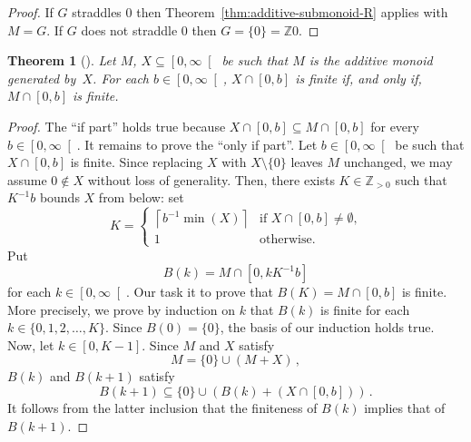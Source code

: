 \documentclass[12pt]{article}
\newcommand{\bZ}{\mathbb{Z}}
\newcommand{\bNast}{\bZ_{> 0}}
\newcommand{\bR}{\mathbb{R}}
\newcommand{\Rnneg}{\left[0, \infty\right[} %
\newcommand{\ceil}[1]{\left\lceil #1  \right\rceil}
\newtheorem{theorem}{Theorem}
\theoremstyle{definition}
\begin{document}
\begin{proof}
  If $G$ straddles $0$ then Theorem~\ref{thm:additive-submonoid-R} applies with $M = G$.
  If $G$ does not straddle $0$ then $G = \{ 0 \} = \bZ 0$.
\end{proof}

  

\begin{theorem}[\cite{AbelsManoussos2012}] \label{thm:additive-closure}
  Let $M$, $X \subseteq \Rnneg$ be such that $M$ is the additive monoid generated by~$X$.
  For each $b \in \Rnneg$, $X \cap [0, b]$ is finite if, and only if, $M \cap [0, b]$ is finite.
\end{theorem}

\begin{proof}
  The ``if part'' holds true because $X \cap [0, b] \subseteq M \cap [0, b]$ for every $b \in \Rnneg$.
  It remains to prove the ``only if part''.
  Let $b \in \Rnneg$ be such that $X \cap [0, b]$ is finite.
  Since replacing $X$ with $X \setminus \{ 0 \}$ leaves $M$ unchanged,  
  we may assume $0 \notin X$ without loss of generality.
  Then, there exists $K \in \bNast$ such that $K^{-1} b$ bounds $X$ from below:
  set
  $$
  K = \begin{cases}
    \ceil{b^{-1} \min (X)} & \text{if   $X \cap [0, b] \ne \emptyset$,} \\
    1 & \text{otherwise.}
  \end{cases}
  $$
  Put
  $$
  B(k) = M \cap \left[0, k K^{-1} b \right]
  $$
  for each $k \in \Rnneg$.
  Our task it to prove that $B(K) = M \cap [0, b]$ is finite.
  More precisely, we prove by induction on $k$ that $B(k)$ is finite for each $k \in \{ 0, 1, 2, \ldots, K \}$.
  Since $B(0) = \{ 0 \}$, the basis of our induction holds true.
  Now, let $k \in [0, K - 1]$.
  Since $M$ and $X$ satisfy
  $$
  M = \{ 0 \} \cup (M + X) \,,
  $$
  $B(k)$ and $B(k + 1)$ satisfy
  $$
  B(k + 1) \subseteq \{ 0 \} \cup \left(  B(k) + \left( X \cap [0, b]  \right) \right) \,.
  $$
  It follows from the latter inclusion that the finiteness of $B(k)$ implies that of $B(k + 1)$.
\end{proof}
\end{document}
